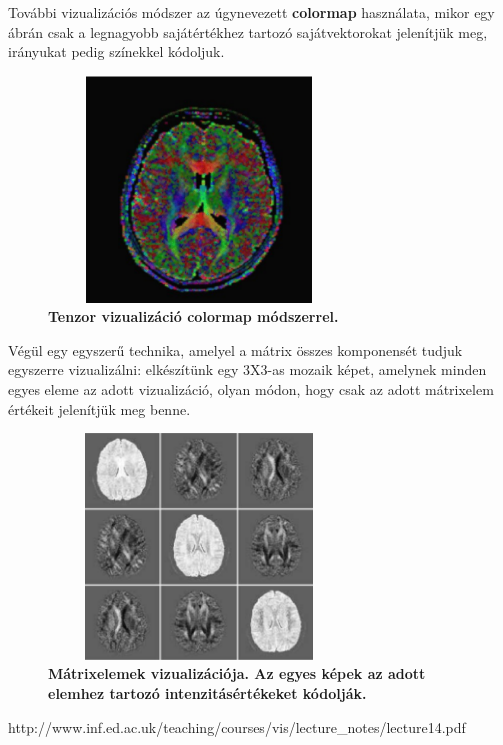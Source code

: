 \documentclass[12pt]{article}
\theoremstyle{plain}
\begin{document}
  További vizualizációs módszer az úgynevezett \textbf{colormap} használata, mikor egy ábrán csak a legnagyobb sajátértékhez tartozó sajátvektorokat jelenítjük meg, irányukat pedig színekkel kódoljuk. 
 
  \begin{figure}[H]
    \centering
    \includegraphics[width=8cm, height=6cm]{media/colormap.PNG}
    \caption{\textbf{Tenzor vizualizáció colormap módszerrel.}}
    \label{fig:GeneralDiagram}
 \end{figure}
 
 Végül egy egyszerű technika, amelyel a mátrix összes komponensét tudjuk egyszerre vizualizálni: elkészítünk egy 3X3-as mozaik képet, amelynek minden egyes eleme az adott vizualizáció, olyan módon, hogy csak az adott mátrixelem értékeit jelenítjük meg benne.
 
 \begin{figure}[H]
    \centering
    \includegraphics[width=8cm, height=6cm]{media/brain.PNG}
    \caption{\textbf{Mátrixelemek vizualizációja. Az egyes képek az adott elemhez tartozó intenzitásértékeket kódolják.}}
    \label{fig:GeneralDiagram}
 \end{figure}
 
 \newline
 http://www.inf.ed.ac.uk/teaching/courses/vis/lecture_notes/lecture14.pdf
 
\end{document}
